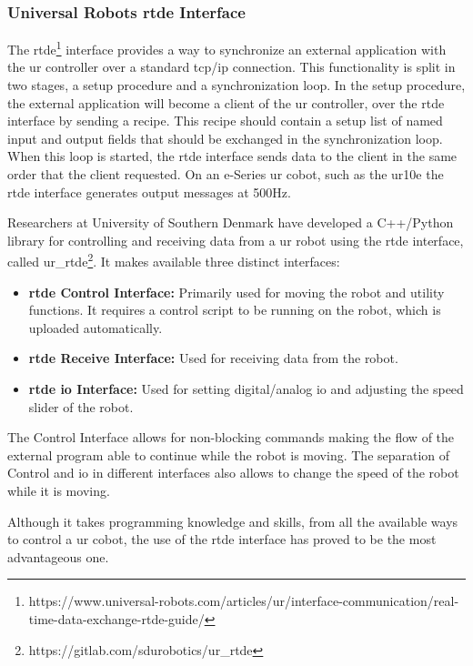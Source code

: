 \subsubsection{Universal Robots \acs{rtde} Interface}

\par The \ac{rtde}\footnote{https://www.universal-robots.com/articles/ur/interface-communication/real-time-data-exchange-rtde-guide/} interface provides a way to synchronize an external application with the \ac{ur} controller over a standard \acs{tcp}/\acs{ip} connection. This functionality is split in two stages, a setup procedure and a synchronization loop. In the setup procedure, the external application will become a client of the \ac{ur} controller, over the \ac{rtde} interface by sending a recipe. This recipe should contain a setup list of named input and output fields that should be exchanged in the synchronization loop. When this loop is started, the \ac{rtde} interface sends data to the client in the same order that the client requested. On an e-Series \ac{ur} cobot, such as the \ac{ur10e} the \ac{rtde} interface generates output messages at 500Hz. 
\par Researchers at University of Southern Denmark have developed a C++/Python library for controlling and receiving data from a \ac{ur} robot using the \ac{rtde} interface, called ur\_rtde\footnote{https://gitlab.com/sdurobotics/ur\_rtde}. It makes available three distinct interfaces: 

\begin{itemize}
    \item \textbf{\ac{rtde} Control Interface: }Primarily used for moving the robot and utility functions. It requires a control script to be running on the robot, which is uploaded automatically.
    \item \textbf{\ac{rtde} Receive Interface: }Used for receiving data from the robot.
    \item \textbf{\ac{rtde} \acs{io} Interface: }Used for setting digital/analog \acs{io} and adjusting the speed slider of the robot.
\end{itemize}

\noindent The Control Interface allows for non-blocking commands making the flow of the external program able to continue while the robot is moving. The separation of Control and \acs{io} in different interfaces also allows to change the speed of the robot while it is moving. 
\par Although it takes programming knowledge and skills, from all the available ways to control a \ac{ur} cobot, the use of the \ac{rtde} interface has proved to be the most advantageous one.

